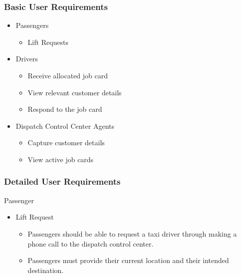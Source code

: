 \documentclass[10pt,twocolumn]{witseiepaper}
\begin{document}
\subsubsection{Basic User Requirements}
\begin{itemize}
\item Passengers
\begin{itemize}
\item Lift Requests 
\end{itemize}

\item Drivers
\begin{itemize}
\item Receive allocated job card
\item View relevant customer details
\item Respond to the job card 
\end{itemize}

\item Dispatch Control Center Agents
\begin{itemize}
\item Capture customer details
\item View active job cards
\end{itemize}
\end{itemize}

\subsubsection{Detailed User Requirements}
Passenger 
\begin{itemize}
\item Lift Request
\begin{itemize}
\item Passengers should be able to request a taxi driver through making a phone call to the dispatch control center.
\item Passengers must provide their current location and their intended destination.
\end{itemize}
\end{itemize}
\end{document}
